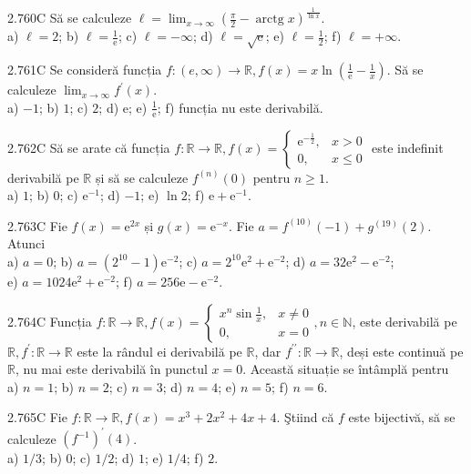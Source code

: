 \documentclass[11pt]{article}
\begin{document}
2.760C Să se calculeze $\ell=\lim _{x \rightarrow \infty}\left(\frac{\pi}{2}-\operatorname{arctg} x\right)^{\frac{1}{\ln x}}$.\\ a) $\ell=2$; b) $\ell=\frac{1}{\mathrm{e}}$; c) $\ell=-\infty$; d) $\ell=\sqrt{\mathrm{e}}$; e) $\ell=\frac{1}{2}$; f) $\ell=+\infty$.

2.761C Se consideră funcția $f:(e, \infty) \rightarrow \mathbb{R}, f(x)=x \ln \left(\frac{1}{\mathrm{e}}-\frac{1}{x}\right)$. Să se calculeze $\lim _{x \rightarrow \infty} f^{\prime}(x)$.\\ a) $-1$; b) $1$; c) $2$; d) $\mathrm{e}$; e) $\frac{1}{\mathrm{e}}$; f) funcția nu este derivabilă.

2.762C Să se arate că funcția $f: \mathbb{R} \rightarrow \mathbb{R}, f(x)= \begin{cases}\mathrm{e}^{-\frac{1}{2}}, & x>0 \\ 0, & x \leq 0\end{cases}$ este indefinit derivabilă pe $\mathbb{R}$ și să se calculeze $f^{(n)}(0)$ pentru $n \geq 1$.\\ a) $1$; b) $0$; c) $\mathrm{e}^{-1}$; d) $-1$; e) $\ln 2$; f) $\mathrm{e}+\mathrm{e}^{-1}$.

2.763C Fie $f(x)=\mathrm{e}^{2 x}$ și $g(x)=\mathrm{e}^{-x}$. Fie $a=f^{(10)}(-1)+g^{(19)}(2)$. Atunci\\ a) $a=0$; b) $a=\left(2^{10}-1\right) \mathrm{e}^{-2}$; c) $a=2^{10} \mathrm{e}^{2}+\mathrm{e}^{-2}$; d) $a=32 \mathrm{e}^{2}-\mathrm{e}^{-2}$;\\ e) $a=1024 \mathrm{e}^{2}+\mathrm{e}^{-2}$; f) $a=256 \mathrm{e}-\mathrm{e}^{-2}$.

2.764C Funcția $f: \mathbb{R} \rightarrow \mathbb{R}, f(x)=\left\{\begin{array}{ll}x^{n} \sin \frac{1}{x}, & x \neq 0 \\ 0, & x=0\end{array}, n \in \mathbb{N}\right.$, este derivabilă pe $\mathbb{R}, f^{\prime}: \mathbb{R} \rightarrow \mathbb{R}$ este la rândul ei derivabilă pe $\mathbb{R}$, dar $f^{\prime \prime}: \mathbb{R} \rightarrow \mathbb{R}$, deși este continuă pe $\mathbb{R}$, nu mai este derivabilă în punctul $x=0$. Această situație se întâmplă pentru\\ a) $n=1$; b) $n=2$; c) $n=3$; d) $n=4$; e) $n=5$; f) $n=6$.

2.765C Fie $f: \mathbb{R} \rightarrow \mathbb{R}, f(x)=x^{3}+2 x^{2}+4 x+4$. Ştiind că $f$ este bijectivă, să se calculeze $\left(f^{-1}\right)^{\prime}(4)$.\\ a) $1 / 3$; b) $0$; c) $1 / 2$; d) $1$; e) $1 / 4$; f) $2$.
\end{document}
